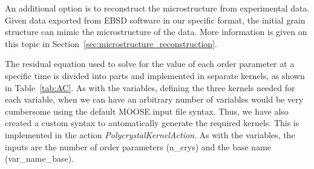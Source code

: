 \documentclass[letter,12pt,fleqn]{article}
\begin{document}
An additional option is to reconstruct the microstructure from experimental data. Given data exported from EBSD software in our specific format, the initial grain structure can mimic the microstructure of the data.  More information is given on this topic in Section~\ref{sec:microstructure_reconstruction}.

The residual equation used to solve for the value of each order parameter at a specific time is divided into parts and implemented in separate kernels, as shown in Table~\ref{tab:AC}. As with the variables, defining the three kernels needed for each variable, when we can have an arbitrary number of variables would be very cumbersome using the default MOOSE input file syntax. Thus, we have also created a custom syntax to automatically generate the required kernels. This is implemented in the action \textit{PolycrystalKernelAction}. As with the variables, the inputs are the number of order parameters (n\_crys) and the base name (var\_name\_base).
\end{document}
